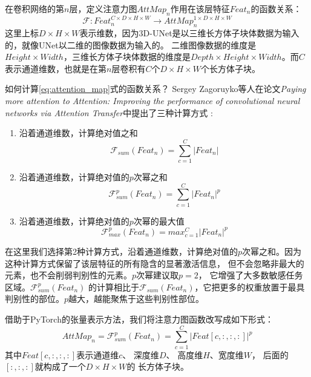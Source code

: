 在卷积网络的第$n$层，定义注意力图${AttMap}_{n}$作用在该层特征${Feat}_{n}$的函数关系：
\begin{equation}\label{eq:attention_map}
    \mathcal{F}: {Feat}_{n}^{C \times D \times H \times W} \longrightarrow {AttMap}_{n}^{1 \times D \times H \times W}
\end{equation}
这里上标$D \times H \times W$表示维数，因为3D-UNet是以三维长方体子块体数据为输入的，就像UNet以二维的图像数据为输入的。
二维图像数据的维度是$Height \times Width$，三维长方体子块体数据的维度是$Depth \times Height \times Width$。而$C$
表示通道维数，也就是在第$n$层卷积有$C$个$D \times H \times W$个长方体子块。

如何计算\ref{eq:attention_map}式的函数关系？ Sergey Zagoruyko等人在论文\textit{Paying more attention to Attention: 
Improving the performance of convolutional neural networks via Attention Transfer}中提出了三种计算方式
\cite{Zagoruyko2016PayingMA}:
\begin{enumerate}
    \item 沿着通道维数，计算绝对值之和  
    \begin{equation}
        \mathcal{F}_{sum}({Feat}_{n}) = \sum_{c=1}^{C}{\left\lvert {Feat}_{n} \right\rvert}
    \end{equation}
    
    \item 沿着通道维数，计算绝对值的$p$次幂之和
    \begin{equation}
        \mathcal{F}_{sum}^{p}({Feat}_{n}) = \sum_{c=1}^{C}{\left\lvert {Feat}_{n} \right\rvert}^{p}
    \end{equation}
    
    \item 沿着通道维数，计算绝对值的$p$次幂的最大值
    \begin{equation}
        \mathcal{F}_{max}^{p}({Feat}_{n}) = {max}_{c=1}^{C}{\left\lvert {Feat}_{n} \right\rvert}^{p}
    \end{equation}
\end{enumerate}
在这里我们选择第2种计算方式，沿着通道维数，计算绝对值的$p$次幂之和。因为这种计算方式保留了该层特征的所有隐含的显著激活信息，
但不会忽略非最大的元素，也不会削弱判别性的元素。$p$次幂建议取$p = 2$， 它增强了大多数敏感任务区域。$\mathcal{F}_{sum}^{p}({Feat}_{n})$
的计算相比于$\mathcal{F}_{sum}({Feat}_{n})$，它把更多的权重放置于最具判别性的部位。$p$越大，越能聚焦于这些判别性部位。

借助于PyTorch的张量表示方法，我们将注意力图函数改写成如下形式：
\begin{equation}
    {AttMap}_{n} = \mathcal{F}_{sum}^{p}(Feat_{n}) = \sum_{c=1}^{C}{\left\lvert {Feat}[c, :, :, :] \right\rvert}^{p}
\end{equation}
其中$Feat[c, :, :, :]$表示通道维$c$、 深度维$D$、 高度维$H$、宽度维$W$， 后面的$[:, :, :]$就构成了一个$D \times H \times W$的
长方体子块。

